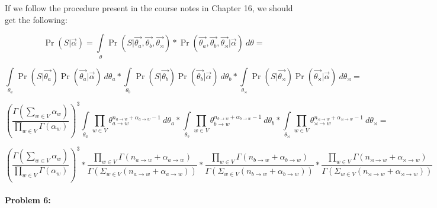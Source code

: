 \documentclass[10pt]{article}
\newenvironment{AnswerBox}{\begin{mdframed}[style=simple]}{\end{mdframed}}
\begin{document}
\begin{AnswerBox}%
If we follow the procedure present in the course notes in Chapter 16, we should get the following:

$$
\Pr(S|\vec{\alpha}) = \int\limits_{\theta} \Pr(S | \vec{\theta_{a}}, 
\vec{\theta_{b}}, 
\vec{\theta_{\rtimes}}) * 
\Pr(\vec{\theta_{a}}, 
\vec{\theta_{b}}, 
\vec{\theta_{\rtimes}} |
\vec{\alpha}) 
\ d\theta =
$$

$$
\int\limits_{\theta_{a}} \Pr(S | \vec{\theta_{a}})
\Pr(\vec{\theta_{a}} | 
\vec{\alpha}) 
\ d\theta_{a} *
\int\limits_{\theta_{b}} \Pr(S | \vec{\theta_{b}})
\Pr(\vec{\theta_{b}} | 
\vec{\alpha}) 
\ d\theta_{b} *
\int\limits_{\theta_{\rtimes}} \Pr(S | \vec{\theta_{\rtimes}})
\Pr(\vec{\theta_{\rtimes}} | 
\vec{\alpha}) 
\ d\theta_{\rtimes} =
$$

$$
(\frac{\Gamma(\sum_{w \in V} \alpha_w)}{\prod_{w \in V} \Gamma(\alpha_w)})^3 
\int\limits_{\theta_{a}} 
\prod _{w \in V} \theta_{a \rightarrow w}^{n_{a \rightarrow w} + \alpha_{a \rightarrow w} -1}
\ d\theta_{a} *
\int\limits_{\theta_{b}} 
\prod _{w \in V} \theta_{b \rightarrow w}^{n_{b \rightarrow w} + \alpha_{b \rightarrow w} -1}
\ d\theta_{b} *
\int\limits_{\theta_{\rtimes}} 
\prod _{w \in V} \theta_{\rtimes \rightarrow w}^{n_{\rtimes \rightarrow w} + \alpha_{\rtimes \rightarrow w} -1}
\ d\theta_{\rtimes} =
$$

$$
(\frac{\Gamma(\sum_{w \in V} \alpha_w)}{\prod_{w \in V} \Gamma(\alpha_w)})^3 *
\frac{\prod_{w \in V} \Gamma(n_{a \rightarrow w} + \alpha_{a \rightarrow w})}
{\Gamma(\Sigma_{w \in V} (n_{a \rightarrow w} + \alpha_{a \rightarrow w}))} *
\frac{\prod_{w \in V} \Gamma(n_{b \rightarrow w} + \alpha_{b \rightarrow w})}
{\Gamma(\Sigma_{w \in V} (n_{b \rightarrow w} + \alpha_{b \rightarrow w}))} *
\frac{\prod_{w \in V} \Gamma(n_{\rtimes \rightarrow w} + \alpha_{\rtimes \rightarrow w})}
{\Gamma(\Sigma_{w \in V} (n_{\rtimes \rightarrow w} + \alpha_{\rtimes \rightarrow w}))}
$$

    
\end{AnswerBox}%


\hrulefill %

\paragraph{Problem 6:}
\end{document}
